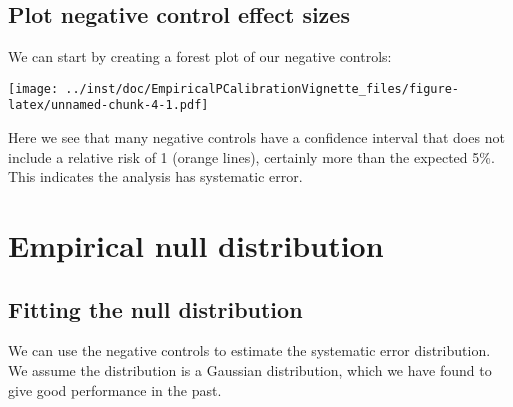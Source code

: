 \documentclass[]{article}
\newenvironment{Shaded}{\begin{snugshade}}{\end{snugshade}}
\newcommand{\KeywordTok}[1]{\textcolor[rgb]{0.13,0.29,0.53}{\textbf{#1}}}
\newcommand{\NormalTok}[1]{#1}
\newcommand{\OperatorTok}[1]{\textcolor[rgb]{0.81,0.36,0.00}{\textbf{#1}}}
\newcommand{\StringTok}[1]{\textcolor[rgb]{0.31,0.60,0.02}{#1}}
\begin{document}
\hypertarget{plot-negative-control-effect-sizes}{%
\subsection{Plot negative control effect
sizes}\label{plot-negative-control-effect-sizes}}

We can start by creating a forest plot of our negative controls:

\begin{Shaded}
\end{Shaded}

\texttt{[image: ../inst/doc/EmpiricalPCalibrationVignette\_files/figure-latex/unnamed-chunk-4-1.pdf]}

Here we see that many negative controls have a confidence interval that
does not include a relative risk of 1 (orange lines), certainly more
than the expected 5\%. This indicates the analysis has systematic error.

\hypertarget{empirical-null-distribution}{%
\section{Empirical null
distribution}\label{empirical-null-distribution}}

\hypertarget{fitting-the-null-distribution}{%
\subsection{Fitting the null
distribution}\label{fitting-the-null-distribution}}

We can use the negative controls to estimate the systematic error
distribution. We assume the distribution is a Gaussian distribution,
which we have found to give good performance in the past.

\begin{Shaded}
\end{Shaded}
\end{document}
